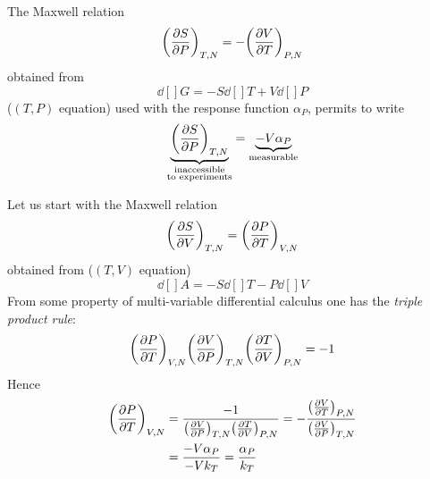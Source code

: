 \documentclass[../main/main.tex]{subfiles}
\begin{document}
\begin{example}{}{}
  The Maxwell relation
  \begin{equation*}
    \qty(\pdv{S}{P} )_{T,N} = - \qty(\pdv{V}{T} )_{P,N}
  \end{equation*}
  obtained from
  \begin{equation*}
\dd[]{G} = - S \dd[]{T} + V \dd[]{P}
  \end{equation*}
  (\( (T,P) \) equation) used with the response function \( \alpha _P \), permits to write
\begin{equation}
  \underbrace{\qty(\pdv{S}{P} )_{T,N}}_{\substack{ \text{inaccessible} \\  \text{to experiments} } }  = \underbrace{- V \alpha _P}_{\text{measurable}}
  \label{eq:}
\end{equation}
\end{example}
\begin{example}{}{}
Let us start with the Maxwell relation
\begin{equation*}
  \qty(\pdv{S}{V} )_{T,N} =  \qty(\pdv{P}{T} )_{V,N}
\end{equation*}
obtained from   (\( (T,V) \) equation)
\begin{equation*}
    \dd[]{A} = - S \dd[]{T} - P \dd[]{V}
\end{equation*}
From some property of multi-variable differential calculus one has the \textit{triple product rule}:
\begin{equation*}
    \qty(\pdv{P}{T} )_{V,N}  \qty(\pdv{V}{P} )_{T,N}   \qty(\pdv{T}{V} )_{P,N} =-1
\end{equation*}
Hence
\begin{equation}
\begin{split}
    \qty(\pdv{P}{T} )_{V,N} &= \frac{-1}{ \qty(\pdv{V}{P} )_{T,N}   \qty(\pdv{T}{V} )_{P,N} }  = - \frac{  \qty(\pdv{V}{T} )_{P,N} }{   \qty(\pdv{V}{P} )_{T,N} } \\
    &= \frac{-V \alpha _P}{-V k_T} = \frac{\alpha _P}{k _T}
\end{split}
  \label{eq:}
\end{equation}
\end{example}
\end{document}
